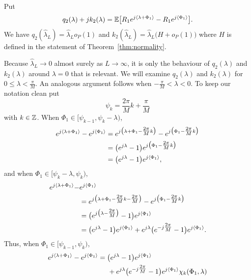 \documentclass[draftcls, onecolumn, 11pt]{IEEEtran}
\begin{document}
\begin{lemma}\label{lem:q2k2parts}
Put
\[
q_2(\lambda) + j k_2(\lambda) = {\mathbb E}\big[ R_1 e^{j\left\langle \lambda + \Phi_1 \right\rangle} - R_1 e^{j\left\langle \Phi_1 \right\rangle}  \big].
\]
We have $q_2(\hat{\lambda}_L) = \hat{\lambda}_L o_P(1)$ and $k_2(\hat{\lambda}_L) = \hat{\lambda}_L \big( H + o_P(1) \big)$ where $H$ is defined in the statement of Theorem~\ref{thm:normality}.
\end{lemma}
\begin{IEEEproof}
Because $\hat{\lambda}_L \rightarrow 0$ almost surely as $L\rightarrow\infty$, it is only the behaviour of $q_2(\lambda)$ and $k_2(\lambda)$ around $\lambda = 0$ that is relevant.  We will examine $q_2(\lambda)$ and $k_2(\lambda)$ for $0 \leq \lambda < \tfrac{\pi}{M}$.  An analogous argument follows when $-\tfrac{\pi}{M} < \lambda < 0$.  To keep our notation clean put 
\[
\psi_k = \frac{2\pi}{M}k + \frac{\pi}{M}
\] 
with $k \in {\mathbb Z}$.  When $\Phi_1 \in [\psi_{k-1}, \psi_k - \lambda)$,
\begin{align*}
e^{j\left\langle \lambda + \Phi_1 \right\rangle} - e^{j\left\langle \Phi_1 \right\rangle} &=  e^{j\big(\lambda + \Phi_1 - \tfrac{2\pi}{M}k\big)} - e^{j\big( \Phi_1- \tfrac{2\pi}{M}k\big)} \\
&= \big(e^{j\lambda} - 1 \big) e^{j\big(\Phi_1- \tfrac{2\pi}{M}k\big)} \\
&= \big(e^{j\lambda} - 1 \big) e^{j\left\langle \Phi_1 \right\rangle},
\end{align*}
and when $\Phi_1 \in [\psi_{k} - \lambda, \psi_k)$,
\begin{align*}
e^{j\left\langle \lambda + \Phi_1 \right\rangle} - &e^{j\left\langle \Phi_1 \right\rangle} \\
&=  e^{j\big(\lambda + \Phi_1 - \tfrac{2\pi}{M}k - \tfrac{2\pi}{M}\big)} - e^{j\big( \Phi_1- \tfrac{2\pi}{M}k\big)} \\
&= \big(e^{j\big(\lambda - \tfrac{2\pi}{M}\big)} - 1 \big) e^{j\left\langle \Phi_1 \right\rangle} \\
&= \big(e^{j\lambda} - 1 \big) e^{j\left\langle \Phi_1 \right\rangle}  + e^{j\lambda}\big( e^{-j\tfrac{2\pi}{M}} - 1 \big)e^{j\left\langle \Phi_1 \right\rangle}.
\end{align*}
Thus, when $\Phi_1 \in [\psi_{k-1}, \psi_k)$,
\begin{align*}
e^{j\left\langle \lambda + \Phi_1 \right\rangle} - e^{j\left\langle \Phi_1 \right\rangle} &= \big(e^{j\lambda} - 1 \big) e^{j\left\langle \Phi_1 \right\rangle} \\
&\hspace{0.5cm} + e^{j\lambda}\big( e^{-j\tfrac{2\pi}{M}} - 1 \big)e^{j\left\langle \Phi_1 \right\rangle} \chi_k(\Phi_1,\lambda)
\end{align*}

\end{IEEEproof}
\end{document}
